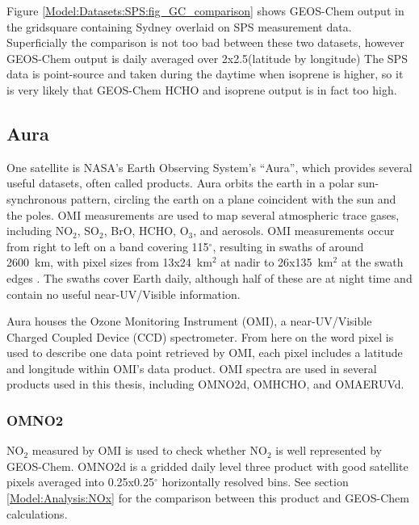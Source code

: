     
    Figure \ref{Model:Datasets:SPS:fig_GC_comparison} shows GEOS-Chem output in the gridsquare containing Sydney overlaid on SPS measurement data.
    Superficially the comparison is not too bad between these two datasets, however GEOS-Chem output is daily averaged over 2x2.5\degr (latitude by longitude)
    The SPS data is point-source and taken during the daytime when isoprene is higher, so it is very likely that GEOS-Chem HCHO and isoprene output is in fact too high.
    
  
  \subsection{Aura}
    \label{Model:Datasets:Aura}
    
    One satellite is NASA's Earth Observing System's ``Aura'', which provides several useful datasets, often called products.
    Aura orbits the earth in a polar sun-synchronous pattern, circling the earth on a plane coincident with the sun and the poles.
    OMI measurements are used to map several atmospheric trace gases, including NO$_2$, SO$_2$, BrO, HCHO, O$_3$, and aerosols.
    OMI measurements occur from right to left on a band covering 115$^{\circ}$, resulting in swaths of around 2600~km, with pixel sizes from 13x24~km$^2$ at nadir to 26x135~km$^2$ at the swath edges \citep{Abad2015}.
    The swaths cover Earth daily, although half of these are at night time and contain no useful near-UV/Visible information.
    
    Aura houses the Ozone Monitoring Instrument (OMI), a near-UV/Visible Charged Coupled Device (CCD) spectrometer.
    From here on the word pixel is used to describe one data point retrieved by OMI, each pixel includes a latitude and longitude within OMI's data product.
    OMI spectra are used in several products used in this thesis, including OMNO2d, OMHCHO, and OMAERUVd.
    
    \subsubsection{OMNO2}
      \label{Model:Datasets:Aura:omno2d}
      NO$_2$ measured by OMI is used to check whether NO$_2$ is well represented by GEOS-Chem. 
      OMNO2d is a gridded daily level three product with good satellite pixels averaged into 0.25x0.25$^{\circ}$ horizontally resolved bins.
      See section \ref{Model:Analysis:NOx} for the comparison between this product and GEOS-Chem calculations.
    
